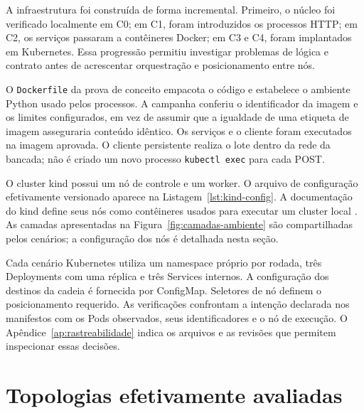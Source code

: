 A infraestrutura foi construída de forma incremental. Primeiro, o núcleo foi verificado localmente em C0; em C1, foram introduzidos os processos HTTP; em C2, os serviços passaram a contêineres Docker; em C3 e C4, foram implantados em Kubernetes. Essa progressão permitiu investigar problemas de lógica e contrato antes de acrescentar orquestração e posicionamento entre nós.

O \texttt{Dockerfile} da prova de conceito empacota o código e estabelece o ambiente Python usado pelos processos. A campanha conferiu o identificador da imagem e os limites configurados, em vez de assumir que a igualdade de uma etiqueta de imagem asseguraria conteúdo idêntico. Os serviços e o cliente foram executados na imagem aprovada. O cliente persistente realiza o lote dentro da rede da bancada; não é criado um novo processo \texttt{kubectl exec} para cada POST.

O cluster kind possui um nó de controle e um worker. O arquivo de configuração efetivamente versionado aparece na Listagem~\ref{lst:kind-config}. A documentação do kind define seus nós como contêineres usados para executar um cluster local \cite{kinddocumentation}. As camadas apresentadas na Figura~\ref{fig:camadas-ambiente} são compartilhadas pelos cenários; a configuração dos nós é detalhada nesta seção.

\begin{sourcecode}[htbp]
\caption{Configuração dos dois nós virtuais do cluster kind.}
\label{lst:kind-config}

\end{sourcecode}

Cada cenário Kubernetes utiliza um namespace próprio por rodada, três Deployments com uma réplica e três Services internos. A configuração dos destinos da cadeia é fornecida por ConfigMap. Seletores de nó definem o posicionamento requerido. As verificações confrontam a intenção declarada nos manifestos com os Pods observados, seus identificadores e o nó de execução. O Apêndice~\ref{ap:rastreabilidade} indica os arquivos e as revisões que permitem inspecionar essas decisões.

\section{Topologias efetivamente avaliadas}
\label{sec:topologias}

